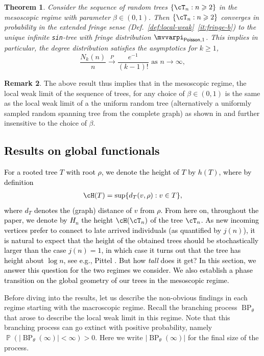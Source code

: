 \documentclass[letterpaper,11pt,reqno]{amsart}
\newtheorem{thm}{Theorem}[section]
\theoremstyle{definition}
\newtheorem{rem}[thm]{Remark}
\renewcommand{\geq}{\geqslant}
\newcommand{\set}[1]{\left\{#1\right\}}
\DeclareMathOperator{\pr}{\mathds{P}}
\newcommand{\convp}{\stackrel{P}{\longrightarrow}}
\DeclareMathOperator{\BP}{BP}
\newcommand{\Poi}{{\sf Poisson} }
\newcommand{\fpm}{\mvvarpi}
\begin{document}
\begin{thm}
\label{thm:lwc-meso}
     Consider the sequence of random trees $\set{\cT_n:n\geq 2}$ in the mesoscopic regime with parameter $\beta \in (0,1)$. Then $\set{\cT_n:n\geq 2}$ converges in probability in the extended fringe sense (Def.~\ref{def:local-weak}~\eqref{it:fringe-b}) to the unique infinite {\tt sin}-tree with fringe distribution $\fpm_{\Poi, 1}$. This implies in particular, the degree distribution satisfies the asymptotics for $k\geq 1$,
     \[
\frac{N_k(n)}{n} \convp \frac{e^{-1}}{(k-1)!} \text{ as } n\to\infty,
\]
\end{thm}

\begin{rem}
    The above result thus implies that in the mesoscopic regime, the local weak limit of the sequence of trees, for any choice of $\beta \in (0,1)$ is the same as the local weak limit of a the uniform random tree (alternatively a uniformly sampled random spanning tree from the complete graph) as shown in \cite{grimmett1980random} and further insensitive to the choice of $\beta$. 
\end{rem}



\subsection{\textcolor{black}{Results on global functionals}}

\textcolor{black}{For a rooted tree $T$ with root $\rho$, we denote the height of $T$ by $h(T)$, where by definition
\begin{align*}
    \cH(T)=\sup\{d_T(v,\rho):v \in T\},
\end{align*}
where $d_T$ denotes the (graph) distance of $v$ from $\rho$. From here on, throughout the paper, we denote by $H_n$ the height $\cH(\cT_n)$ of the tree $\cT_n$. {As new incoming vertices prefer to connect to late arrived individuals (as quantified by $j(n)$), it is natural to expect that the height of the obtained trees should be stochastically larger than the case $j(n)=1$, in which case it turns out that the tree has height about $\log n$, see e.g., Pittel \cite{pittel1994note}. But how \emph{tall} does it get? In this section, we answer this question for the two regimes we consider. We also establish a phase transition on the global geometry of our trees in the mesoscopic regime.}
}

Before diving into the results, let us describe the non-obvious findings in each regime starting with the macroscopic regime. Recall the branching process $\BP_\theta$ that arose to describe the local weak limit in this regime.  Note that this branching process can go extinct with positive probability, namely $\pr(|\BP_{\theta}(\infty)| < \infty) >0$. Here we write $|\BP_\theta(\infty)|$ for the final size of the process.   
\end{document}

